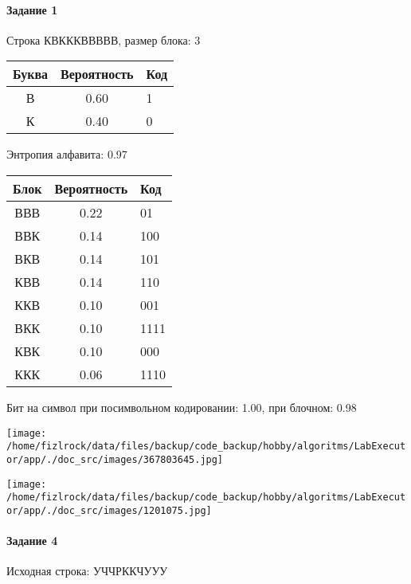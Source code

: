 \documentclass[a4paper, 12pt]{article}
\begin{document}
\paragraph{Задание 1}

Строка КВКККВВВВВ, размер блока: 3
\begin{center}
 \begin{tabular}{ |c|c|l| } 
  \hline
     Буква & Вероятность & Код\\ \hline
В & 0.60 & 1\\\hline
К & 0.40 & 0
\\ \hline \end{tabular}
\end{center}
Энтропия алфавита: 0.97
\begin{center}
 \begin{tabular}{ |c|c|l| } 
  \hline
     Блок & Вероятность & Код\\ \hline
ВВВ & 0.22 & 01\\\hline
ВВК & 0.14 & 100\\\hline
ВКВ & 0.14 & 101\\\hline
КВВ & 0.14 & 110\\\hline
ККВ & 0.10 & 001\\\hline
ВКК & 0.10 & 1111\\\hline
КВК & 0.10 & 000\\\hline
ККК & 0.06 & 1110
\\ \hline \end{tabular}
\end{center}
Бит на символ при посимвольном кодировании: 1.00, при блочном: 0.98

\texttt{[image: /home/fizlrock/data/files/backup/code\_backup/hobby/algoritms/LabExecutor/app/./doc\_src/images/367803645.jpg]}

\texttt{[image: /home/fizlrock/data/files/backup/code\_backup/hobby/algoritms/LabExecutor/app/./doc\_src/images/1201075.jpg]}
\paragraph{Задание 4}


Исходная строка: УЧЧРККЧУУУ
\end{document}
